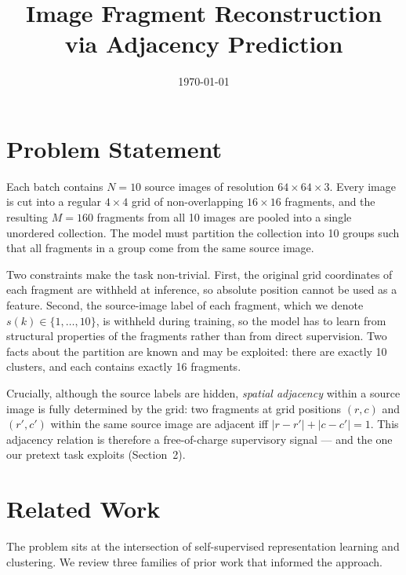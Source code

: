 \documentclass[12pt, a4paper]{article}
\title{Image Fragment Reconstruction via Adjacency Prediction}
\author{}
\date{\today}
\begin{document}
\maketitle
\tableofcontents
\newpage

\section{Problem Statement}

Each batch contains $N = 10$ source images of resolution $64 \times 64 \times 3$.
Every image is cut into a regular $4 \times 4$ grid of non-overlapping
$16 \times 16$ fragments, and the resulting $M = 160$ fragments from all 10
images are pooled into a single unordered collection. The model must partition
the collection into 10 groups such that all fragments in a group come from the
same source image.

Two constraints make the task non-trivial. First, the original grid coordinates
of each fragment are withheld at inference, so absolute position cannot be used
as a feature. Second, the source-image label of each fragment, which we denote
$s(k) \in \{1, \dots, 10\}$, is withheld during training, so the model has to
learn from structural properties of the fragments rather than from direct
supervision. Two facts about the partition are known and may be exploited:
there are exactly 10 clusters, and each contains exactly 16 fragments.

Crucially, although the source labels are hidden, \emph{spatial adjacency}
within a source image is fully determined by the grid: two fragments at grid
positions $(r, c)$ and $(r', c')$ within the same source image are adjacent
iff $|r - r'| + |c - c'| = 1$. This adjacency relation is therefore a
free-of-charge supervisory signal --- and the one our pretext task exploits
(Section~2).

\section{Related Work}

The problem sits at the intersection of self-supervised representation learning and
clustering. We review three families of prior work that informed the approach.
\end{document}
